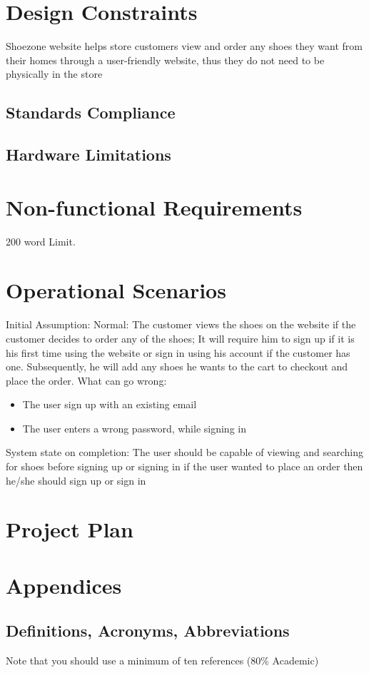 \documentclass[12pt]{article}
\begin{document}
\section{Design Constraints}
Shoezone website helps store customers view and order any shoes they want from their homes through a user-friendly website, thus they do not need to be physically in the store 

\subsection{ Standards Compliance}

\subsection{ Hardware Limitations}


\section{Non-functional Requirements}
200 word Limit.





\section{Operational Scenarios}
Initial Assumption: 
Normal: The customer views the shoes on the website if the customer decides to order any of the shoes; It will require him to sign up if it is his first time using the website or sign in using his account if the customer has one. Subsequently, he will add any shoes he wants to the cart to checkout and place the order.
What can go wrong:

\begin{itemize}
\item The user sign up with an existing email
\item The user enters a wrong password, while signing in
\end{itemize}
System state on completion: The user should be capable of viewing and searching for shoes before signing up or signing in if the user wanted to place an order then he/she should sign up or sign in 
\section{Project Plan}


\section{Appendices}

\subsection{Definitions, Acronyms, Abbreviations}


\printbibliography
Note that you should use a minimum of ten references (80\% Academic)
\end{document}
